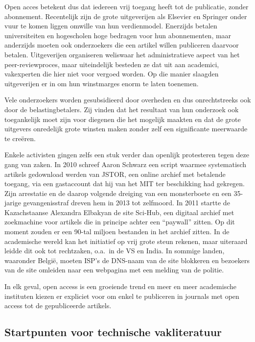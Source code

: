 Open acces betekent dus dat iedereen vrij toegang heeft tot de publicatie, zonder abonnement. Recentelijk zijn de grote uitgeverijen als Elsevier en Springer onder vuur te komen liggen omwille van hun verdienmodel. Enerzijds betalen universiteiten en hogescholen hoge bedragen voor hun abonnementen, maar anderzijds moeten ook onderzoekers die een artikel willen publiceren daarvoor betalen. Uitgeverijen organiseren weliswaar het administratieve aspect van het peer-reviewproces, maar uiteindelijk besteden ze dat uit aan academici, vakexperten die hier niet voor vergoed worden. Op die manier slaagden uitgeverijen er in om hun winstmarges enorm te laten toenemen. 

Vele onderzoekers worden gesubsidieerd door overheden en dus onrechtstreeks ook door de belastingbetalers. Zij vinden dat het resultaat van hun onderzoek ook toegankelijk moet zijn voor diegenen die het mogelijk maakten en dat de grote uitgevers onredelijk grote winsten maken zonder zelf een significante meerwaarde te creëren.

Enkele activisten gingen zelfs een stuk verder dan openlijk protesteren tegen deze gang van zaken. In 2010 schreef Aaron Schwarz een script waarmee systematisch artikels gedownload werden van JSTOR, een online archief met betalende toegang, via een gastaccount dat hij van het MIT ter beschikking had gekregen. Zijn arrestatie en de daarop volgende dreiging van een monsterboete en een 35-jarige gevangenisstraf dreven hem in 2013 tot zelfmoord. In 2011 startte de Kazachstaanse Alexandra Elbakyan de site Sci-Hub, een digitaal archief met zoekmachine voor artikels die in principe achter een ``paywall'' zitten. Op dit moment zouden er een 90-tal miljoen bestanden in het archief zitten. In de academische wereld kan het initiatief op vrij grote steun rekenen, maar uiteraard leidde dit ook tot rechtzaken, o.a.\ in de VS en India. In sommige landen, waaronder België, moeten ISP's de DNS-naam van de site blokkeren en bezoekers van de site omleiden naar een webpagina met een melding van de politie.

In elk geval, open access is een groeiende trend en meer en meer academische instituten kiezen er expliciet voor om enkel te publiceren in journals met open access tot de gepubliceerde artikels.

\subsection{Startpunten voor technische vakliteratuur}%
\label{ssec:technische-vakliteratuur}

